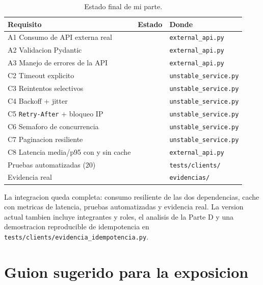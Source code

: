 \documentclass[11pt,a4paper]{article}
\newcommand{\arch}[1]{\texttt{#1}}
\newcommand{\ok}{\textcolor{verde}{\textbf{\checkmark}}}
\begin{document}
\begin{table}[H]
\centering
\begin{tabular}{l l l}
\toprule
\textbf{Requisito} & \textbf{Estado} & \textbf{Donde} \\
\midrule
A1 Consumo de API externa real       & \ok & \arch{external\_api.py} \\
A2 Validacion Pydantic               & \ok & \arch{external\_api.py} \\
A3 Manejo de errores de la API       & \ok & \arch{external\_api.py} \\
C2 Timeout explicito                 & \ok & \arch{unstable\_service.py} \\
C3 Reintentos selectivos             & \ok & \arch{unstable\_service.py} \\
C4 Backoff + jitter                  & \ok & \arch{unstable\_service.py} \\
C5 \arch{Retry-After} + bloqueo IP   & \ok & \arch{unstable\_service.py} \\
C6 Semaforo de concurrencia          & \ok & \arch{unstable\_service.py} \\
C7 Paginacion resiliente             & \ok & \arch{unstable\_service.py} \\
C8 Latencia media/p95 con y sin cache& \ok & \arch{external\_api.py} \\
Pruebas automatizadas (20)           & \ok & \arch{tests/clients/} \\
Evidencia real                       & \ok & \arch{evidencias/} \\
\bottomrule
\end{tabular}
\caption{Estado final de mi parte.}
\end{table}

La integracion queda completa: consumo resiliente de las dos dependencias,
cache con metricas de latencia, pruebas automatizadas y evidencia real. La
version actual tambien incluye integrantes y roles, el analisis de la Parte D
y una demostracion reproducible de idempotencia en
\arch{tests/clients/evidencia\_idempotencia.py}.

\appendix
\section{Guion sugerido para la exposicion}
\end{document}
